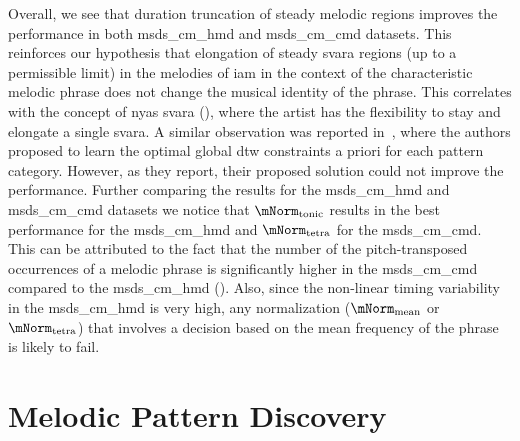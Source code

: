 Overall, we see that duration truncation of steady melodic regions improves the performance in both \acrshort{msds_cm_hmd} and \acrshort{msds_cm_cmd} datasets. This reinforces our hypothesis that elongation of steady \gls{svara} regions (up to a permissible limit) in the melodies of \gls{iam} in the context of the characteristic melodic phrase does not change the musical identity of the phrase. This correlates with the concept of \gls{nyas} \gls{svara} (), where the artist has the flexibility to stay and elongate a single \gls{svara}. A similar observation was reported in~\cite{Rao2014}, where the authors proposed to learn the optimal global \gls{dtw} constraints a priori for each pattern category. However, as they report, their proposed solution could not improve the performance. Further comparing the results for the \acrshort{msds_cm_hmd} and \acrshort{msds_cm_cmd} datasets we notice that $\mNorm_\mathrm{tonic}$ results in the best performance for the \acrshort{msds_cm_hmd} and $\mNorm_\mathrm{tetra}$ for the \acrshort{msds_cm_cmd}. This can be attributed to the fact that the number of the pitch-transposed occurrences of a melodic phrase is significantly higher in the \acrshort{msds_cm_cmd} compared to the \acrshort{msds_cm_hmd} (). Also, since the non-linear timing variability in the \acrshort{msds_cm_hmd} is very high, any normalization ($\mNorm_\mathrm{mean}$ or $\mNorm_\mathrm{tetra}$) that involves a decision based on the mean frequency of the phrase is likely to fail.




\section{Melodic Pattern Discovery}
\label{sec:patterns_melodic_pattern_discovery}


